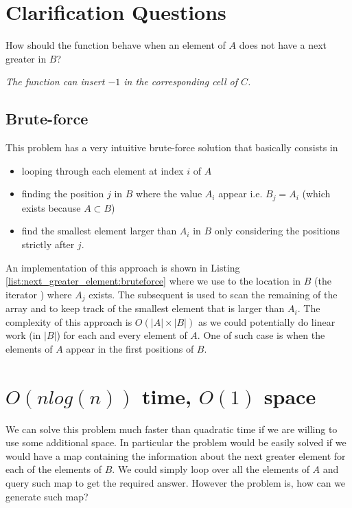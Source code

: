 \section{Clarification Questions}

\begin{QandA}
	\item How should the function behave when an element of $A$ does not have a next greater in $B$?
	\begin{answered}
		\textit{The function can insert $-1$ in the corresponding cell of $C$.}
	\end{answered}
	
\end{QandA}

\subsection{Brute-force}
\label{next_greater_element:sec:bruteforce}
This problem has a very intuitive brute-force solution that basically consists in 
\begin{itemize}
	\item looping through each element at index $i$ of $A$
	\item finding the position $j$ in $B$ where the value $A_i$ appear i.e. $B_j = A_i$ (which
	exists because $A \subset B$)
	\item find the smallest element larger than $A_i$ in $B$ only considering the positions strictly
	after $j$.
\end{itemize}
An implementation of this approach is shown in Listing \ref{list:next_greater_element:bruteforce} where we use
 to the location in $B$ (the iterator ) where $A_j$ exists. The
subsequent  is used to scan the remaining of the array and to keep track of the
smallest element that is larger than $A_i$. The complexity of this approach is $O(|A| \times |B|)$
as we could potentially do linear  work (in $|B|$) for each and every element of $A$. One of such
case is when the elements of $A$ appear in the first positions of $B$. 



\section{$O(nlog(n))$ time, $O(1)$ space}
\label{next_greater_element:sec:lineartime}
We can solve this problem much faster than quadratic time if we are willing to use some additional
space. In particular the problem would be easily solved if we would have a map containing the
information about the next greater element for each of the elements of $B$. We could simply loop
over all the elements of $A$ and query such map to get the required answer. However the problem is,
how can we generate such map?

